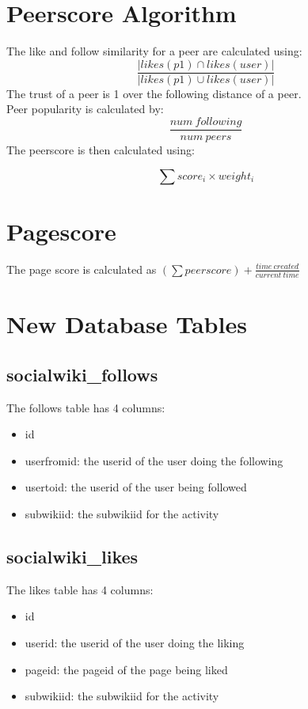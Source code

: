 \documentclass[letterpaper,twoside,11pt]{article}
\begin{document}
\section{Peerscore Algorithm}
	The like and follow similarity for a peer are calculated using:
		\[
		\frac{|likes (p1)\cap likes(user)|}{|likes(p1)\cup likes (user)|}
	\]
	The trust of a peer is 1 over the following distance of a peer.
	\newline
	\\Peer popularity is calculated by:
		\[
		\frac{num\ following}{num\ peers}
	\]
	The peerscore is then calculated using:
	
		\[
		\sum score_i\times weight_i
	\]
	
\section{Pagescore}
	The page score is calculated as $(\sum peerscore)+\frac{time\ created}{current\ time} $
	
\section{New Database Tables}
	\subsection{socialwiki\_follows}
	The follows table has 4 columns:
	\begin{itemize}
		\item id
		\item userfromid: the userid of the user doing the following
		\item usertoid: the userid of the user being followed
		\item subwikiid: the subwikiid for the activity
	\end{itemize}
	\subsection{socialwiki\_likes}
	The likes table has 4 columns:
	\begin{itemize}
		\item id
		\item userid: the userid of the user doing the liking
		\item pageid: the pageid of the page being liked
		\item subwikiid: the subwikiid for the activity
	\end{itemize}
	
\end{document}
